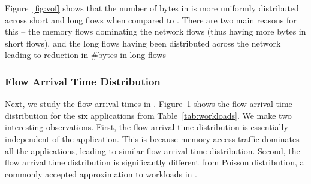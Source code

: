 Figure~\ref{fig:vof} shows that the number of bytes in \dis is more uniformly distributed across short and long flows when compared to \pdis. There are two main reasons for this -- the memory flows dominating the network flows (thus having more bytes in short flows), and the long flows having been distributed across the network leading to reduction in \#bytes in long flows 
%
\begin{figure}
  \centering
  \caption{\small{}}
  \label{fig:fat}
\end{figure}
%
\subsubsection{Flow Arrival Time Distribution}
\label{ssec:fatd}
Next, we study the flow arrival times in \dis. Figure~\ref{fig:fat} shows the flow arrival time distribution for the six applications from Table~\ref{tab:workloads}. We make two interesting observations. First, the flow arrival time distribution is essentially independent of the application. This is because memory access traffic dominates all the applications, leading to similar flow arrival time distribution. Second, the flow arrival time distribution is significantly different from Poisson distribution, a commonly accepted approximation to workloads in \pdis. 

